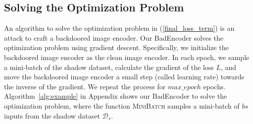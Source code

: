 \subsection{Solving the Optimization Problem}
An algorithm to solve the optimization problem in (\ref{final_loss_term}) is an attack to craft a backdoored image encoder. Our BadEncoder solves the optimization problem using gradient descent. 
Specifically, we initialize the backdoored image encoder as the clean image encoder. In each epoch, we sample a mini-batch of the shadow dataset, calculate the gradient of the loss $L$, and move the backdoored image encoder a small step (called learning rate) towards the inverse of the gradient. We repeat the process for $max\_epoch$ epochs. Algorithm~\ref{alg:example}  in Appendix shows our BadEncoder to solve the optimization problem, where the function \textsc{MiniBatch} samples a mini-batch of $bs$ inputs from the shadow dataset $\mathcal{D}_s$. 




